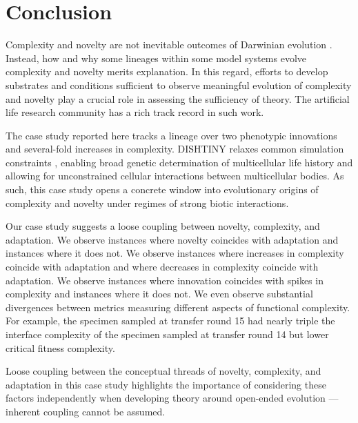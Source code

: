 \section{Conclusion}

Complexity and novelty are not inevitable outcomes of Darwinian evolution \citep{stanley2017open}.
Instead, how and why some lineages within some model systems evolve complexity and novelty merits explanation.
In this regard, efforts to develop substrates and conditions sufficient to observe meaningful evolution of complexity and novelty play a crucial role in assessing the sufficiency of theory.
The artificial life research community has a rich track record in such work.

The case study reported here tracks a lineage over two phenotypic innovations and several-fold increases in complexity.
DISHTINY relaxes common simulation constraints \citep{goldsby2012task, goldsby2014evolutionary}, enabling broad genetic determination of multicellular life history and allowing for unconstrained cellular interactions between multicellular bodies.
As such, this case study opens a concrete window into evolutionary origins of complexity and novelty under regimes of strong biotic interactions.

Our case study suggests a loose coupling between novelty, complexity, and adaptation.
We observe instances where novelty coincides with adaptation and instances where it does not.
We observe instances where increases in complexity coincide with adaptation and where decreases in complexity coincide with adaptation.
We observe instances where innovation coincides with spikes in complexity and instances where it does not.
We even observe substantial divergences between metrics measuring different aspects of functional complexity.
For example, the specimen sampled at transfer round 15 had nearly triple the interface complexity of the specimen sampled at transfer round 14 but lower critical fitness complexity.

Loose coupling between the conceptual threads of novelty, complexity, and adaptation in this case study highlights the importance of considering these factors independently when developing theory around open-ended evolution --- inherent coupling cannot be assumed.

